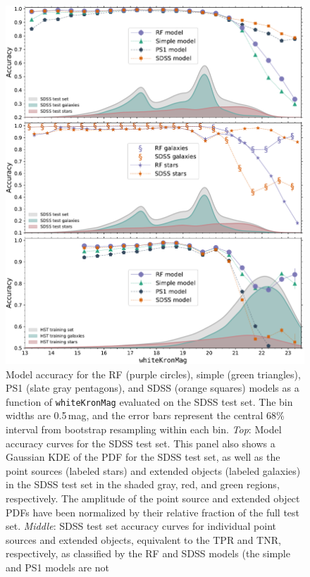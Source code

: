 \documentclass[twocolumn, dvipdfmx]{aastex62}
\begin{document}
\begin{CJK*}{UTF8}{gbsn}
\begin{figure}[htb]
 \centering
  \includegraphics[width=6.2in]{./Figures/SDSS_acc_mag.pdf}
  \caption{ Model accuracy for the RF (purple circles), simple (green
  triangles), PS1 (slate gray pentagons), and SDSS (orange squares) models
  as a function of \texttt{whiteKronMag} evaluated on the SDSS test set. The
  bin widths are 0.5\,mag, and the error bars represent the central 68\%
  interval from bootstrap resampling within each bin.
  \textit{Top}: Model accuracy curves for the SDSS test set. This panel also
  shows a Gaussian KDE of the PDF for the SDSS test set, as well as the
  point sources (labeled stars) and extended objects (labeled galaxies) in
  the SDSS test set in the shaded gray, red, and green regions,
  respectively. The amplitude of the point source and extended object PDFs
  have been normalized by their relative fraction of the full test set.
  \textit{Middle}: SDSS test set accuracy curves for individual point
  sources and extended objects, equivalent to the TPR and TNR, respectively,
  as classified by the RF and SDSS models (the simple and PS1 models are not
}
\end{figure}
\end{CJK*}
\end{document}
